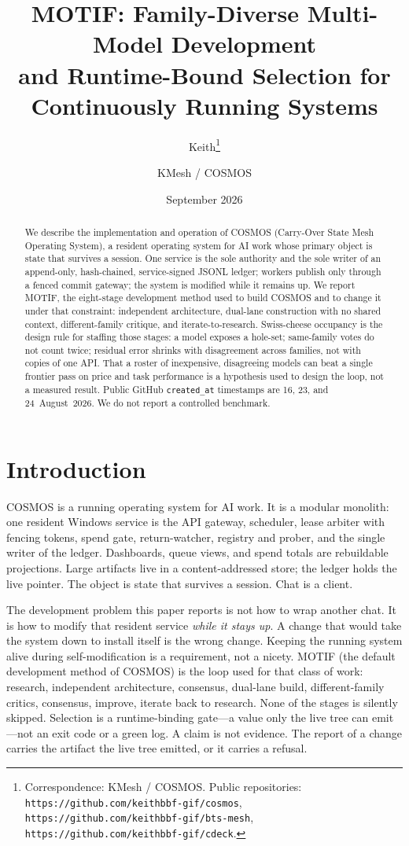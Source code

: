 \documentclass[11pt]{article}
\title{MOTIF: Family-Diverse Multi-Model Development\\
and Runtime-Bound Selection for Continuously Running Systems}
\author{
Keith\thanks{Correspondence: KMesh / COSMOS. Public repositories:
\texttt{https://github.com/keithbbf-gif/cosmos},
\texttt{https://github.com/keithbbf-gif/bts-mesh},
\texttt{https://github.com/keithbbf-gif/cdeck}.}
\and
KMesh / COSMOS
}
\date{September 2026}
\begin{document}
\maketitle

\begin{abstract}
We describe the implementation and operation of COSMOS (Carry-Over
State Mesh Operating System), a resident operating system for AI work
whose primary object is state that survives a session. One service is
the sole authority and the sole writer of an append-only, hash-chained,
service-signed JSONL ledger; workers publish only through a fenced
commit gateway; the system is modified while it remains up. We report
MOTIF, the eight-stage development method used to build COSMOS and to
change it under that constraint: independent architecture, dual-lane
construction with no shared context, different-family critique, and
iterate-to-research. Swiss-cheese occupancy is the design rule for
staffing those stages: a model exposes a hole-set; same-family votes
do not count twice; residual error shrinks with disagreement across
families, not with copies of one API. That a roster of inexpensive,
disagreeing models can beat a single frontier pass on price and task
performance is a hypothesis used to design the loop, not a measured
result. Public GitHub \texttt{created\_at} timestamps are 16, 23, and
24~August~2026. We do not report a controlled benchmark.
\end{abstract}

\section{Introduction}

COSMOS is a running operating system for AI work. It is a modular
monolith: one resident Windows service is the API gateway, scheduler,
lease arbiter with fencing tokens, spend gate, return-watcher, registry
and prober, and the single writer of the ledger. Dashboards, queue
views, and spend totals are rebuildable projections. Large artifacts
live in a content-addressed store; the ledger holds the live pointer.
The object is state that survives a session. Chat is a client.

The development problem this paper reports is not how to wrap another
chat. It is how to modify that resident service \emph{while it stays
up}. A change that would take the system down to install itself is the
wrong change. Keeping the running system alive during self-modification
is a requirement, not a nicety. MOTIF (the default development method
of COSMOS) is the loop used for that class of work: research,
independent architecture, consensus, dual-lane build, different-family
critics, consensus, improve, iterate back to research. None of the
stages is silently skipped. Selection is a runtime-binding gate---a
value only the live tree can emit---not an exit code or a green log.
A claim is not evidence. The report of a change carries the artifact
the live tree emitted, or it carries a refusal.
\end{document}
